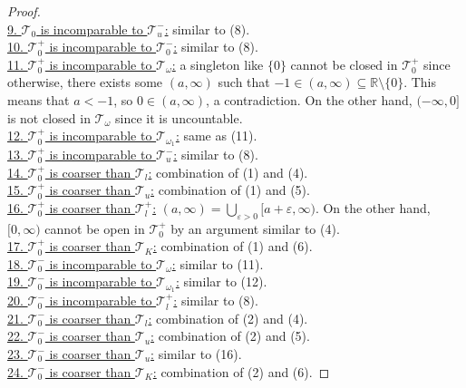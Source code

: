 \documentclass{treatise}
\begin{document}
\begin{proof}
\\
\underline{9. $\mathcal{T}_0$ is incomparable to $\mathcal{T}_u^-$:} similar to (8).
\\
\underline{10. $\mathcal{T}_0^+$ is incomparable to $\mathcal{T}_0^-$:} similar to (8).
\\
\underline{11. $\mathcal{T}_0^+$ is incomparable to $\mathcal{T}_\omega$:} a singleton like $\{ 0 \}$ cannot be closed in $\mathcal{T}_0^+$ since otherwise, there exists some $(a, \infty)$ such that $-1 \in (a, \infty) \subseteq \mathbb{R} \setminus \{ 0 \}$. This means that $a < -1$, so $0 \in (a, \infty)$, a contradiction. On the other hand, $(-\infty, 0]$ is not closed in $\mathcal{T}_\omega$ since it is uncountable.
\\
\underline{12. $\mathcal{T}_0^+$ is incomparable to $\mathcal{T}_{\omega_1}$:} same as (11).
\\
\underline{13. $\mathcal{T}_0^+$ is incomparable to $\mathcal{T}_u^-$:} similar to (8).
\\
\underline{14. $\mathcal{T}_0^+$ is coarser than $\mathcal{T}_l$:} combination of (1) and (4).
\\
\underline{15. $\mathcal{T}_0^+$ is coarser than $\mathcal{T}_u$:} combination of (1) and (5).
\\
\underline{16. $\mathcal{T}_0^+$ is coarser than $\mathcal{T}_l^+$:} $(a, \infty) = \bigcup_{\varepsilon > 0} [a + \varepsilon, \infty)$. On the other hand, $[0, \infty)$ cannot be open in $\mathcal{T}_0^+$ by an argument similar to (4).
\\
\underline{17. $\mathcal{T}_0^+$ is coarser than $\mathcal{T}_K$:} combination of (1) and (6).
\\
\underline{18. $\mathcal{T}_0^-$ is incomparable to $\mathcal{T}_\omega$:} similar to (11).
\\
\underline{19. $\mathcal{T}_0^-$ is incomparable to $\mathcal{T}_{\omega_1}$:} similar to (12).
\\
\underline{20. $\mathcal{T}_0^-$ is incomparable to $\mathcal{T}_l^+$:} similar to (8).
\\
\underline{21. $\mathcal{T}_0^-$ is coarser than $\mathcal{T}_l$:} combination of (2) and (4).
\\
\underline{22. $\mathcal{T}_0^-$ is coarser than $\mathcal{T}_u$:} combination of (2) and (5).
\\
\underline{23. $\mathcal{T}_0^-$ is coarser than $\mathcal{T}_u$:} similar to (16).
\\
\underline{24. $\mathcal{T}_0^-$ is coarser than $\mathcal{T}_K$:} combination of (2) and (6).

\end{proof}
\end{document}
